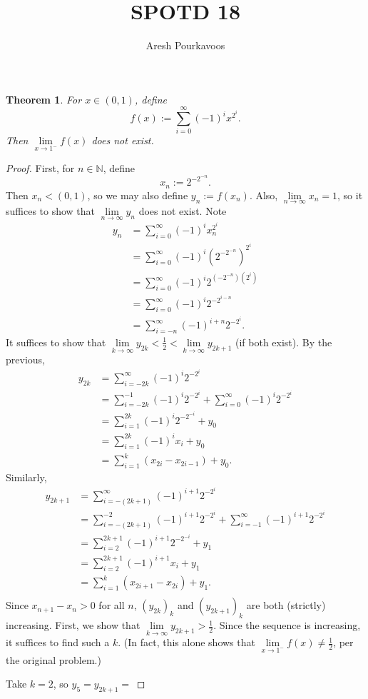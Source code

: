 \documentclass{article}
\newtheorem*{theorem*}{Theorem}
\begin{document}
\title{SPOTD 18}
\author{Aresh Pourkavoos}
\maketitle
\begin{multicols}{2}
\begin{theorem*}
  For $x \in (0, 1)$, define
  \[f(x) := \sum_{i=0}^\infty (-1)^i x^{2^i}.\]
  Then $\lim\limits_{x \rightarrow 1^-} f(x)$ does not exist.
\end{theorem*}

\begin{proof}
  First, for $n \in \mathbb{N}$, define
  \[x_n := 2^{-2^{-n}}.\]
  Then $x_n < (0, 1)$,
  so we may also define $y_n := f(x_n)$.
  Also, $\lim\limits_{n \rightarrow \infty} x_n = 1$,
  so it suffices to show that $\lim\limits_{n \rightarrow \infty} y_n$ does not exist.
  Note
  \begin{align*}
    y_n &= \sum_{i=0}^\infty (-1)^i x_n^{2^i} \\
    &= \sum_{i=0}^\infty (-1)^i \left(2^{-2^{-n}}\right)^{2^i} \\
    &= \sum_{i=0}^\infty (-1)^i 2^{(-2^{-n})(2^i)} \\
    &= \sum_{i=0}^\infty (-1)^i 2^{-2^{i-n}} \\
    &= \sum_{i=-n}^\infty (-1)^{i+n} 2^{-2^i}.
  \end{align*}
  It suffices to show that $\lim\limits_{k \rightarrow \infty} y_{2k} < \frac{1}{2} < \lim\limits_{k \rightarrow \infty} y_{2k+1}$ (if both exist).
  \vfill\null
  By the previous,
  \begin{align*}
    y_{2k} &= \sum_{i=-2k}^\infty (-1)^i 2^{-2^i} \\
    &= \sum_{i=-2k}^{-1} (-1)^i 2^{-2^i} + \sum_{i=0}^\infty (-1)^i 2^{-2^i} \\
    &= \sum_{i=1}^{2k} (-1)^i 2^{-2^{-i}} + y_0 \\
    &= \sum_{i=1}^{2k} (-1)^i x_i + y_0 \\
    &= \sum_{i=1}^{k} (x_{2i}-x_{2i-1}) + y_0.
  \end{align*}
  Similarly,
  \begin{align*}
    y_{2k+1} &= \sum_{i=-(2k+1)}^\infty (-1)^{i+1} 2^{-2^i} \\
    &= \sum_{i=-(2k+1)}^{-2} (-1)^{i+1} 2^{-2^i} + \sum_{i=-1}^\infty (-1)^{i+1} 2^{-2^i} \\
    &= \sum_{i=2}^{2k+1} (-1)^{i+1} 2^{-2^{-i}} + y_1 \\
    &= \sum_{i=2}^{2k+1} (-1)^{i+1} x_i + y_1 \\
    &= \sum_{i=1}^{k} (x_{2i+1}-x_{2i}) + y_1. \\
  \end{align*}
  Since $x_{n+1} - x_n > 0$ for all $n$,
  $(y_{2k})_k$ and $(y_{2k+1})_k$ are both (strictly) increasing.
  \newpage
  First, we show that $\lim\limits_{k \rightarrow \infty} y_{2k+1} > \frac{1}{2}$.
  Since the sequence is increasing, it suffices to find such a $k$.
  (In fact, this alone shows that $\lim\limits_{x \rightarrow 1^-} f(x) \neq \frac{1}{2}$,
  per the original problem.)
  
  Take $k = 2$, so $y_5 = y_{2k+1} = $
  
  \vfill\null
\end{proof}

\end{multicols}
\end{document}
